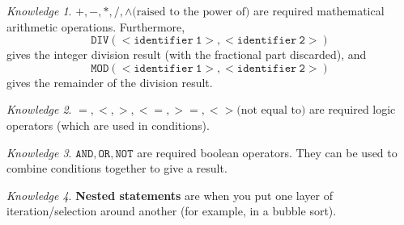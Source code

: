 \documentclass[8pt]{article}
\theoremstyle{remark}
\newtheorem{knowledge}{Knowledge}[subsection]
\begin{document}
            \begin{knowledge}
                \(\mathtt{+}, \mathtt{-}, \mathtt{*}, \mathtt{/}, \mathtt{\wedge} \text{(raised to the power of)}\) are required mathematical arithmetic operations. Furthermore,
                \[
                    \mathtt{DIV(<identifier\ 1>, <identifier\ 2>)}
                \]
                gives the integer division result (with the fractional part discarded), and
                \[
                    \mathtt{MOD(<identifier\ 1>, <identifier\ 2>)}
                \]
                gives the remainder of the division result.
            \end{knowledge}

            \begin{knowledge}
                \(\mathtt{=}, \mathtt{<}, \mathtt{>}, \mathtt{<=}, \mathtt{>=}, \mathtt{<>} \text{(not equal to)}\) are required logic operators (which are used in conditions).
            \end{knowledge}

            \begin{knowledge}
                \(\mathtt{AND}, \mathtt{OR}, \mathtt{NOT}\) are required boolean operators. They can be used to combine conditions together to give a result.
            \end{knowledge}

            \begin{knowledge}
                \textbf{Nested statements} are when you put one layer of iteration/selection around another (for example, in a bubble sort).
            \end{knowledge}
\end{document}

